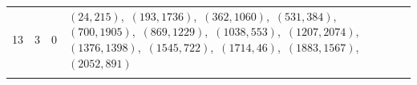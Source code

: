 \documentclass[11pt]{article}
\begin{document}
\begin{longtable}{@{}rrl>{\raggedright\arraybackslash}p{}@{}}
13 & 3 & $0$ & $(24,215)$,\allowbreak\ $(193,1736)$,\allowbreak\ $(362,1060)$,\allowbreak\ $(531,384)$,\allowbreak\ $(700,1905)$,\allowbreak\ $(869,1229)$,\allowbreak\ $(1038,553)$,\allowbreak\ $(1207,2074)$,\allowbreak\ $(1376,1398)$,\allowbreak\ $(1545,722)$,\allowbreak\ $(1714,46)$,\allowbreak\ $(1883,1567)$,\allowbreak\ $(2052,891)$\\
\addlinespace[3pt]
\end{longtable}
\endgroup
\end{document}
